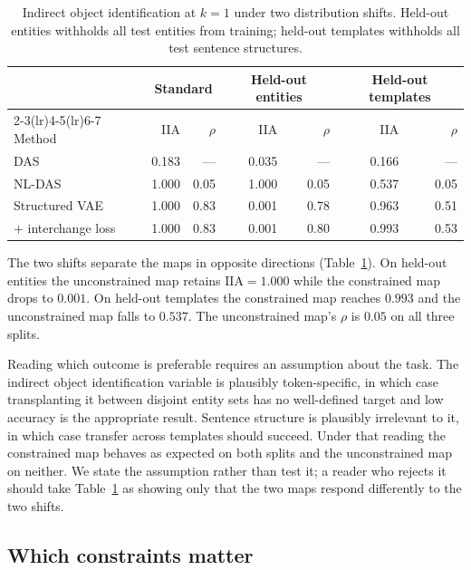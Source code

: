 \documentclass[11pt]{article}
\newcommand{\IIA}{\mathrm{IIA}}
\begin{document}
\begin{table}[t]
\centering
\small
\setlength{\tabcolsep}{5pt}
\begin{tabular}{l rr rr rr}
\toprule
& \multicolumn{2}{c}{Standard} & \multicolumn{2}{c}{Held-out entities} & \multicolumn{2}{c}{Held-out templates} \\
\cmidrule(lr){2-3}\cmidrule(lr){4-5}\cmidrule(lr){6-7}
Method & IIA & $\rho$ & IIA & $\rho$ & IIA & $\rho$ \\
\midrule
DAS                       & 0.183 & ---  & 0.035 & ---  & 0.166 & ---  \\
NL-DAS                    & 1.000 & 0.05 & 1.000 & 0.05 & 0.537 & 0.05 \\
Structured VAE            & 1.000 & 0.83 & 0.001 & 0.78 & 0.963 & 0.51 \\
\quad + interchange loss  & 1.000 & 0.83 & 0.001 & 0.80 & 0.993 & 0.53 \\
\bottomrule
\end{tabular}
\caption{Indirect object identification at $k = 1$ under two distribution
shifts. Held-out entities withholds all test entities from training; held-out
templates withholds all test sentence structures.}
\label{tab:shift}
\end{table}

The two shifts separate the maps in opposite directions
(Table~\ref{tab:shift}). On held-out entities the unconstrained map retains
$\IIA = 1.000$ while the constrained map drops to $0.001$. On held-out templates
the constrained map reaches $0.993$ and the unconstrained map falls to $0.537$.
The unconstrained map's $\rho$ is $0.05$ on all three splits.

Reading which outcome is preferable requires an assumption about the task. The
indirect object identification variable is plausibly token-specific, in which
case transplanting it between disjoint entity sets has no well-defined target and
low accuracy is the appropriate result. Sentence structure is plausibly
irrelevant to it, in which case transfer across templates should succeed. Under
that reading the constrained map behaves as expected on both splits and the
unconstrained map on neither. We state the assumption rather than test it; a
reader who rejects it should take Table~\ref{tab:shift} as showing only that the
two maps respond differently to the two shifts.

\subsection{Which constraints matter}
\label{sec:ablation}
\end{document}
